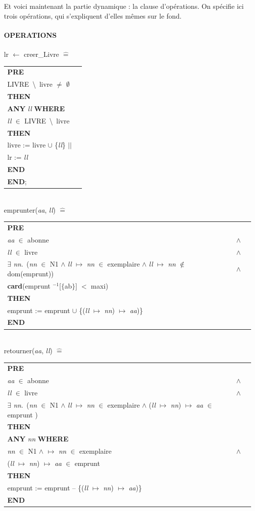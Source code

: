 \documentclass[10pt,a4paper]{article}
\newcommand{\Bequal}{\mathrel{\widehat{=}}}
\begin{document}
Et voici maintenant la partie dynamique : la clause d'opérations. On spécifie ici trois opérations, qui s'expliquent d'elles mêmes sur le fond.
\\
\\
\noindent \textbf{OPERATIONS}\\ \\
\indent lr $\leftarrow$ creer\_Livre $\Bequal$
\begin{longtable}{ll} \textbf{PRE} \tabularnewline
\indent LIVRE\ \textbackslash \ livre $\neq$ $\emptyset$ \tabularnewline
\textbf{THEN} \tabularnewline
\indent \textbf{ANY} \emph{ll} \textbf{WHERE} \tabularnewline \indent \indent \emph{ll} $\in$ LIVRE\ \textbackslash \ livre \tabularnewline
\indent \textbf{THEN} \tabularnewline
\indent \indent livre := livre $\cup$ \{\emph{ll}\} $||$ \tabularnewline
\indent \indent lr := \emph{ll} \tabularnewline
\indent \textbf{END} \tabularnewline
\textbf{END};
\end{longtable}
\ \\ 
\indent emprunter(\emph{aa}, \emph{ll}) $\Bequal$
\begin{longtable}{lll}
\textbf{PRE} \tabularnewline
\indent \emph{aa} $\in$ abonne & $\wedge$ \tabularnewline 
\indent \emph{ll} $\in$ livre & $\wedge$ \tabularnewline
\indent $\exists$ \emph{nn}.\ (\emph{nn} $\in$ N1 $\wedge$ \emph{ll} $\mapsto$ \emph{nn} $\in$ exemplaire $\wedge$ \emph{ll} $\mapsto$ \emph{nn} $\notin$ dom(emprunt)) & $\wedge$ \tabularnewline
\indent \textbf{card}(emprunt $^{-1}$[$\{$ab$\}$] $<$ maxi) \tabularnewline
\textbf{THEN} \tabularnewline \indent emprunt := emprunt $\cup$ \{(\emph{ll} $\mapsto$ \emph{nn}) $\mapsto$ \emph{aa})\} \tabularnewline
\textbf{END} \tabularnewline
\end{longtable}
\ \\ 
\indent retourner(\emph{aa}, \emph{ll}) $\Bequal$
\begin{longtable}{lll}
\textbf{PRE} \tabularnewline
\indent \emph{aa} $\in$ abonne & $\wedge$ \tabularnewline 
\indent \emph{ll} $\in$ livre & $\wedge$ \tabularnewline
\indent $\exists$ \emph{nn}.\ (\emph{nn} $\in$ N1 $\wedge$ \emph{ll} $\mapsto$ \emph{nn} $\in$ exemplaire $\wedge$ (\emph{ll} $\mapsto$ \emph{nn}) $\mapsto$ \emph{aa} $\in$ emprunt )\tabularnewline
\textbf{THEN} \tabularnewline
\indent \textbf{ANY} \emph{nn} \textbf{WHERE} \tabularnewline
\indent \indent \emph{nn} $\in$ N1 $\wedge$ $\mapsto$ \emph{nn} $\in$ exemplaire & $\wedge$ \tabularnewline
\indent \indent (\emph{ll} $\mapsto$ \emph{nn}) $\mapsto$ \emph{aa} $\in$ emprunt \tabularnewline
\indent \textbf{THEN} \tabularnewline
\indent \indent emprunt := emprunt -- \{(\emph{ll} $\mapsto$ \emph{nn}) $\mapsto$ \emph{aa})\} \tabularnewline
\textbf{END} \tabularnewline
\end{longtable}
\end{document}
